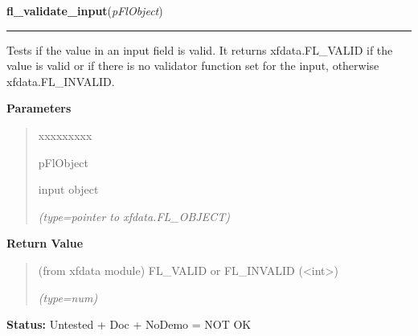 \hspace{.8\funcindent}\begin{boxedminipage}{\funcwidth}

    \raggedright \textbf{fl\_validate\_input}(\textit{pFlObject})

    \vspace{-1.5ex}

    \rule{\textwidth}{0.5\fboxrule}
\setlength{\parskip}{2ex}
    Tests if the value in an input field is valid. It returns 
    xfdata.FL\_VALID if the value is valid or if there is no validator 
    function set for the input, otherwise xfdata.FL\_INVALID.

\setlength{\parskip}{1ex}
      \textbf{Parameters}
      \vspace{-1ex}

      \begin{quote}
        \begin{Ventry}{xxxxxxxxx}

          \item[pFlObject]

          input object

            {\it (type=pointer to xfdata.FL\_OBJECT)}

        \end{Ventry}

      \end{quote}

      \textbf{Return Value}
    \vspace{-1ex}

      \begin{quote}
      (from xfdata module) FL\_VALID or FL\_INVALID 
      ({\textless}int{\textgreater})

      {\it (type=num)}

      \end{quote}

\textbf{Status:} Untested + Doc + NoDemo = NOT OK



    \end{boxedminipage}

    \label{xformslib:flinput:fl_set_input_editkeymap}

    \vspace{0.5ex}

